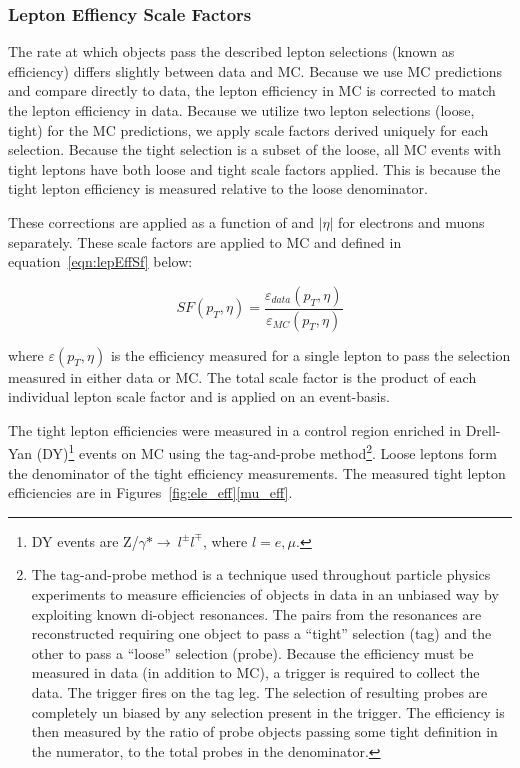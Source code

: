 
\subsubsection{Lepton Effiency Scale Factors}
The rate at which objects pass the described lepton selections (known as efficiency) differs slightly between data and MC. Because we use MC predictions and compare directly to data,
the lepton efficiency in MC is corrected to match the lepton efficiency in data. Because we utilize two lepton selections (loose, tight) for the MC predictions, we apply scale
factors derived uniquely for each selection. Because the tight selection is a subset of the loose, all MC events with tight leptons have both loose and tight scale factors applied.
This is because the tight lepton efficiency is measured relative to the loose denominator. 

These corrections are applied as a function of \pt and $|\eta|$ for electrons and muons
separately. These scale factors are applied to MC and defined in equation~\ref{eqn:lepEffSf} below:

\begin{equation}
\label{eqn:lepEffSf}
 SF(p_{T},\eta) = \frac{\varepsilon_{data}(p_{T},\eta)}{\varepsilon_{MC}(p_{T},\eta)}
\end{equation}

\noindent where $\varepsilon(p_{T},\eta)$ is the efficiency measured for a single lepton to pass the selection measured in either data or MC. The total scale factor is the
product of each individual lepton scale factor and is applied on an event-basis.

The tight lepton efficiencies were measured in a control region enriched in Drell-Yan (DY)\footnote{DY events are Z/$\gamma*\rightarrow~l^{\pm}l^{\mp}$, where $l=e,\mu$.} events on MC using
the tag-and-probe method\footnote{The tag-and-probe method is a technique used throughout particle physics experiments to measure efficiencies of objects in data in an unbiased way by exploiting known
di-object resonances. The pairs from the resonances are reconstructed requiring one object to pass a ``tight'' selection (tag) and the other to pass a ``loose'' selection (probe). Because
the efficiency must be measured in data (in addition to MC), a trigger is required to collect the data. The trigger fires on the tag leg. The selection of resulting probes are completely un
biased by any selection present in the trigger. The efficiency is then measured by the ratio of probe objects passing some tight definition in the numerator, to the total probes in the denominator.}. 
Loose leptons form the denominator of the tight efficiency measurements. The measured tight lepton efficiencies are in Figures~\ref{fig:ele_eff}\ref{mu_eff}.

